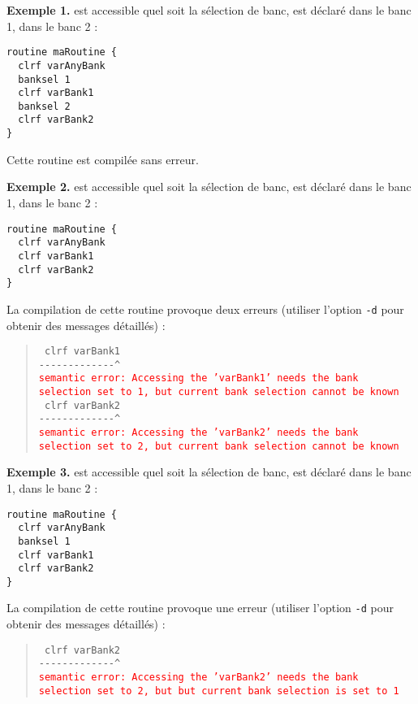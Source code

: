 \textbf{Exemple 1.}  est accessible quel soit la sélection de banc,  est déclaré dans le banc 1,  dans le banc 2 :
\begin{lstlisting}[language=piccolo]
routine maRoutine {
  clrf varAnyBank
  banksel 1
  clrf varBank1
  banksel 2
  clrf varBank2
}
\end{lstlisting}

Cette routine est compilée sans erreur.


\textbf{Exemple 2.}  est accessible quel soit la sélection de banc,  est déclaré dans le banc 1,  dans le banc 2 :
\begin{lstlisting}[language=piccolo]
routine maRoutine {
  clrf varAnyBank
  clrf varBank1
  clrf varBank2
}
\end{lstlisting}

La compilation de cette routine provoque deux erreurs (utiliser l’option \texttt{-d} pour obtenir des messages détaillés) :

\begin{quote}
\texttt{  clrf varBank1}\\
\texttt{-{-}-{-}-{-}-{-}-{-}-{-}-\^{}}\\
\textcolor{red}{\tt semantic error: Accessing the 'varBank1' needs the bank selection set to 1, but current bank selection cannot be known}\\

\texttt{  clrf varBank2}\\
\texttt{-{-}-{-}-{-}-{-}-{-}-{-}-\^}\\
\textcolor{red}{\tt semantic error: Accessing the 'varBank2' needs the bank selection set to 2, but current bank selection cannot be known}
\end{quote}




\textbf{Exemple 3.}  est accessible quel soit la sélection de banc,  est déclaré dans le banc 1,  dans le banc 2 :
\begin{lstlisting}[language=piccolo]
routine maRoutine {
  clrf varAnyBank
  banksel 1
  clrf varBank1
  clrf varBank2
}
\end{lstlisting}

La compilation de cette routine provoque une erreur (utiliser l’option \texttt{-d} pour obtenir des messages détaillés) :

\begin{quote}
\texttt{  clrf varBank2}\\
\texttt{-{-}-{-}-{-}-{-}-{-}-{-}-\^}\\
\textcolor{red}{\tt semantic error: Accessing the 'varBank2' needs the bank selection set to 2, but but current bank selection is set to 1}
\end{quote}













